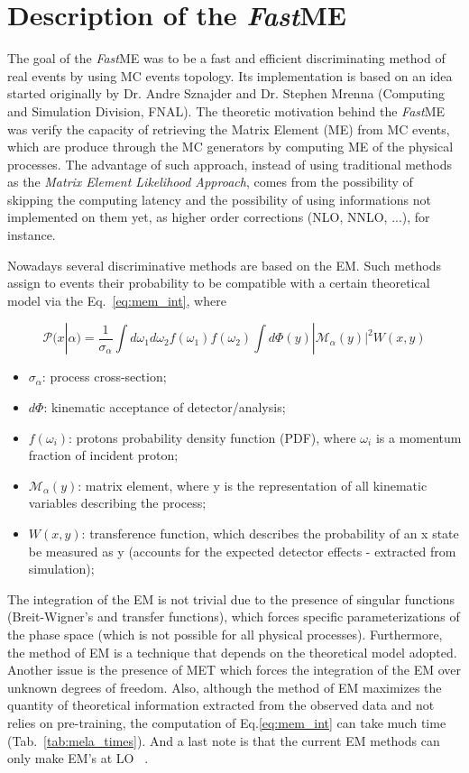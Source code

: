 \section{Description of the \textit{Fast}ME}
The goal of the \textit{Fast}ME was to be a fast and efficient discriminating method of real events by using MC events topology. Its implementation is based on an idea started originally by Dr. Andre Sznajder and Dr. Stephen Mrenna (Computing and Simulation Division, FNAL). The theoretic motivation behind the \textit{Fast}ME was verify the capacity of retrieving the Matrix Element (ME) from MC events, which are produce through the MC generators by computing ME of the physical processes. The advantage of such approach, instead of using traditional methods as the \textit{Matrix Element Likelihood Approach}, comes from the possibility of skipping the computing latency and the possibility of using informations not implemented on them yet, as higher order corrections (NLO, NNLO, ...), for instance.

Nowadays several discriminative methods are based on the EM. Such methods assign to events their probability to be compatible with a certain theoretical model via the Eq.~\ref{eq:mem_int}, where

\begin{equation}
\mathcal{P}(x|\alpha) = \frac{1}{\sigma_{\alpha}} \int d\omega_{1} d\omega_{2} f(\omega_{1}) f(\omega_{2}) \int d\Phi(y)|\mathcal{M}_{\alpha}(y)|^{2} W(x,y)
\label{eq:mem_int}
\end{equation}

\begin{itemize}
	\item $\sigma_{\alpha}$: process cross-section;
	\item $d\Phi$: kinematic acceptance of detector/analysis;
	\item $f(\omega_{i})$: protons probability density function (PDF), where $\omega_{i}$ is a momentum fraction of incident proton;
	\item $\mathcal{M}_{\alpha}(y)$: matrix element, where y is the representation of all kinematic variables describing the process;
	\item $W(x,y)$: transference function, which describes the probability of an x state be measured as y (accounts for the expected detector effects - extracted from simulation);
\end{itemize}

The integration of the EM is not trivial due to the presence of singular functions (Breit-Wigner's and transfer functions), which forces specific parameterizations  of the phase space (which is not possible for all physical processes). Furthermore, the method of EM is a technique that depends on the theoretical model adopted. Another issue is the presence of MET which forces the integration of the EM over unknown degrees of freedom. Also, although the method of EM maximizes the quantity of theoretical information extracted from the observed data and not relies on pre-training, the computation of Eq.\ref{eq:mem_int} can take much time (Tab.~\ref{tab:mela_times}). And a last note is that the current EM methods can only make EM's at LO ~\cite{bib:cms_mela}.

